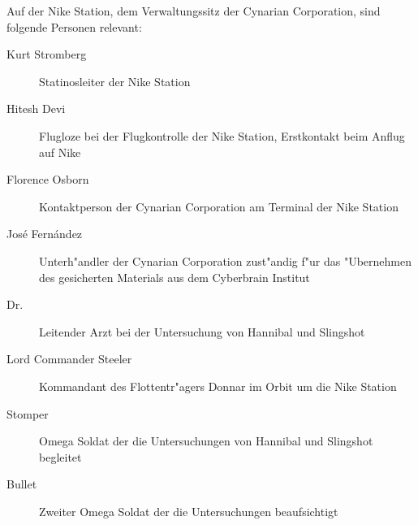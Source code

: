 
Auf der Nike Station, dem Verwaltungssitz der Cynarian Corporation, sind folgende Personen relevant:

\begin{description}
    \item [Kurt Stromberg] Statinosleiter der Nike Station
    \item [Hitesh Devi] Flugloze bei der Flugkontrolle der Nike Station, Erstkontakt beim Anflug auf Nike
    \item [Florence Osborn] Kontaktperson der Cynarian Corporation am Terminal der Nike Station
    \item [Jos\'e Fern\'andez] Unterh"andler der Cynarian Corporation zust"andig f"ur das "Ubernehmen des gesicherten 
        Materials aus dem Cyberbrain Institut
    \item [Dr.~ ] Leitender Arzt bei der Untersuchung von Hannibal und Slingshot
    \item [Lord Commander Steeler] Kommandant des Flottentr"agers Donnar im Orbit um die Nike Station
    \item [Stomper] Omega Soldat der die Untersuchungen von Hannibal und Slingshot begleitet
    \item [Bullet] Zweiter Omega Soldat der die Untersuchungen beaufsichtigt
\end{description}
